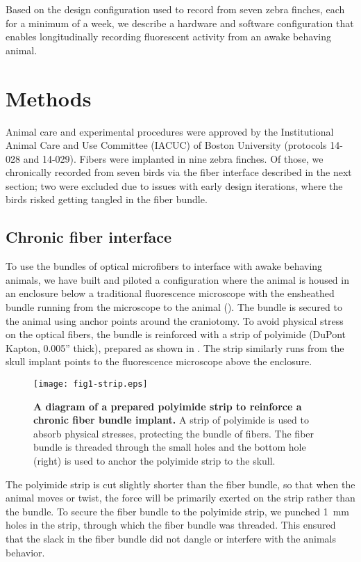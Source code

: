 Based on the design configuration used to record from 
seven zebra finches, each for a minimum of a week, we 
describe a hardware and software configuration that 
enables longitudinally recording fluorescent activity 
from an awake behaving animal.

\section{Methods}

Animal care and experimental procedures were 
approved by the Institutional Animal Care and Use Committee (IACUC) 
of Boston University (protocols 14-028 and 14-029). Fibers were 
implanted in nine zebra finches. Of those, we chronically recorded 
from seven birds via the fiber interface described in the next section; 
two were excluded due to issues with early design iterations, 
where the birds risked getting tangled in the fiber bundle.

\subsection{Chronic fiber interface}

To use the bundles of optical microfibers to interface 
with awake behaving animals, we have built and piloted 
a configuration where the animal is housed in an enclosure 
below a traditional fluorescence microscope with the 
ensheathed bundle running from the microscope to 
the animal (). The bundle is secured to the animal using 
anchor points around the craniotomy. To avoid physical 
stress on the optical fibers, the bundle is reinforced 
with a strip of polyimide (DuPont Kapton, 0.005'' thick),
prepared as shown in . The strip 
similarly runs from the skull implant points to the 
fluorescence microscope above the enclosure.

\begin{figure}
\texttt{[image: fig1-strip.eps]}
\caption[Polyimide to reinforce fiber bundle]{\textbf{A diagram
of a prepared polyimide strip to reinforce a chronic fiber 
bundle implant.} A strip of polyimide is used to absorb physical 
stresses, protecting the bundle of fibers. The fiber bundle is 
threaded through the small holes and the bottom hole (right) is 
used to anchor the polyimide strip to the skull.}
\label{fig:strip}
\end{figure}

The polyimide strip is cut slightly shorter than the fiber 
bundle, so that when the animal moves or twist, the force 
will be primarily exerted on the strip rather than the bundle.
To secure the fiber bundle to the polyimide strip, we 
punched 1~mm holes in the strip, through which the 
fiber bundle was threaded. This ensured that the slack 
in the fiber bundle did not dangle or interfere with 
the animals behavior.

